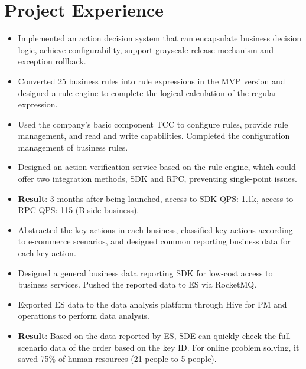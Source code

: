 \documentclass{resume}
\begin{document}
\section{Project Experience}
\begin{itemize}[parsep=0.2ex]
    \item Implemented an action decision system that can encapsulate business decision logic, achieve configurability, 
    support grayscale release mechanism and exception rollback.
    \item Converted 25 business rules into rule expressions in the MVP version and designed a rule engine to complete 
    the logical calculation of the regular expression.
    \item Used the company's basic component TCC to configure rules, provide rule management, and read and write 
    capabilities. Completed the configuration management of business rules.
    \item Designed an action verification service based on the rule engine, which could offer two integration methods, 
    SDK and RPC, preventing single-point issues.
    \item \textbf{Result}: 3 months after being launched, access to SDK QPS: 1.1k, access to RPC QPS: 115 (B-side business).
\end{itemize}

\begin{itemize}[parsep=0.2ex]
    \item Abstracted the key actions in each business, classified key actions according to e-commerce scenarios, and designed 
    common reporting business data for each key action.
    \item Designed a general business data reporting SDK for low-cost access to business services. Pushed the reported data 
    to ES via RocketMQ.
    \item Exported ES data to the data analysis platform through Hive for PM and operations to perform data analysis.
    \item \textbf{Result}: Based on the data reported by ES, SDE can quickly check the full-scenario data of the order based on the key ID. 
    For online problem solving, it saved 75\% of human resources (21 people to 5 people).
\end{itemize}
\end{document}
